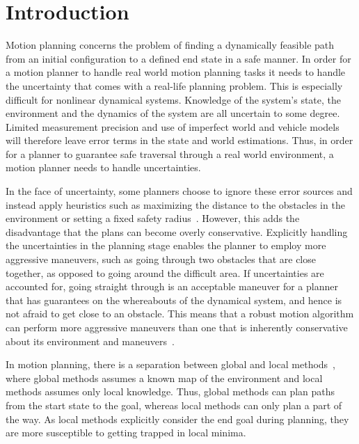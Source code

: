 
\section{Introduction}

Motion planning concerns the problem of finding a
dynamically feasible path from an initial configuration
to a defined end state in a safe manner. In order for a motion
planner to handle real world motion planning tasks it needs
to handle the uncertainty that comes with a real-life planning
problem. This is especially difficult for nonlinear dynamical
systems. Knowledge of the system’s state, the environment and
the dynamics of the system are all uncertain to some degree.
Limited measurement precision and use of imperfect world
and vehicle models will therefore leave error terms in the
state and world estimations. Thus, in order for a planner to
guarantee safe traversal through a real world environment, a
motion planner needs to handle uncertainties.


In the face of uncertainty, some planners choose to ignore these error sources
and instead apply heuristics such as maximizing the distance to the obstacles in
the environment or setting a fixed safety radius~\cite{hoyAlgorithmsCollisionfreeNavigation2015}. However, this adds the
disadvantage that the plans can become overly conservative. Explicitly handling
the uncertainties in the planning stage enables the planner to employ more
aggressive maneuvers, such as going through two obstacles that are close
together, as opposed to going around the difficult area. If uncertainties are
accounted for, going straight through is an acceptable maneuver for a planner
that has guarantees on the whereabouts of the dynamical system, and hence is not
afraid to get close to an obstacle. This means that a robust motion algorithm
can perform more aggressive maneuvers than one that is inherently conservative
about its environment and maneuvers~\cite{singhRobustOnlineMotion2017}.

In motion planning, there is a separation between global
and local methods~\cite{hoyAlgorithmsCollisionfreeNavigation2015}, where global methods assumes a known
map of the environment and local methods assumes only local
knowledge. Thus, global methods can plan paths from the start
state to the goal, whereas local methods can only plan a part
of the way. As local methods explicitly consider the end goal
during planning, they are more susceptible to getting trapped
in local minima.

